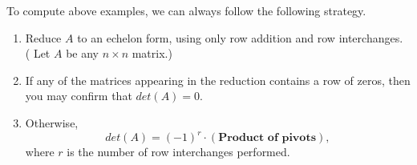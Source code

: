 
\begin{SaveQuestion}[
        key=ch6-det-elemcompute-sbg,
        prompt={Use elementary row operations to help compute the following determinant: $\det \begin{bmatrix} \frac{1}{2} & -\frac{3}{2} & -\frac{1}{2} & \frac{5}{2} \\ 2 & -4 & -2 & 8 \\ -1 & 3 & 6 & -1 \\ 1 & -3 & -1 & 2 \end{bmatrix}$}
][ch6-CON-rowred] %
    To compute above examples, we can always follow the following strategy.
		\begin{enumerate}
			\item Reduce $A$ to an echelon form, using only row addition and row interchanges. ( Let $A$ be any $n \times n$ matrix.)
			\item If any of the matrices appearing in the reduction contains a row of zeros, then you may confirm that $det(A)=0.$
			\item Otherwise, 
			$$ det(A)=(-1)^{r}\cdot (\textbf{Product of pivots}), $$
			where $r$ is the number of row interchanges performed.
		\end{enumerate}
\end{SaveQuestion}


